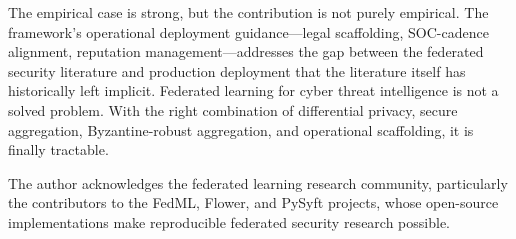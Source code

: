 \documentclass[sigconf,nonacm]{acmart}
\begin{document}
The empirical case is strong, but the contribution is not purely empirical.
The framework's operational deployment guidance---legal scaffolding,
SOC-cadence alignment, reputation management---addresses the gap between
the federated security literature and production deployment that the
literature itself has historically left implicit. Federated learning for
cyber threat intelligence is not a solved problem. With the right
combination of differential privacy, secure aggregation, Byzantine-robust
aggregation, and operational scaffolding, it is finally tractable.

\begin{acks}
The author acknowledges the federated learning research community,
particularly the contributors to the FedML, Flower, and PySyft projects,
whose open-source implementations make reproducible federated security
research possible.
\end{acks}
\end{document}
